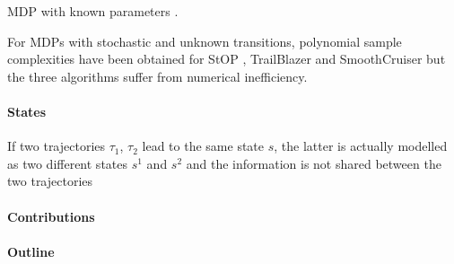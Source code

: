 \documentclass[runningheads]{llncs}
\newcommand{\citep}[1]{\cite{#1}}
\begin{document}
MDP with known parameters \citep{busoniu2012optimistic}.

For MDPs with stochastic and unknown transitions, polynomial sample complexities have been obtained for StOP \citep{STOP14}, TrailBlazer \citep{TrailBlazer16} and SmoothCruiser \citep{SmoothCruiser19} but the three algorithms suffer from numerical inefficiency.

\paragraph{States}



If two trajectories $\tau_1$, $\tau_2$ lead to the same state $s$, the latter is actually modelled as two different states $s^1$ and $s^2$ and the information is not shared between the two trajectories

\paragraph{Contributions}

\paragraph{Outline}
\end{document}
